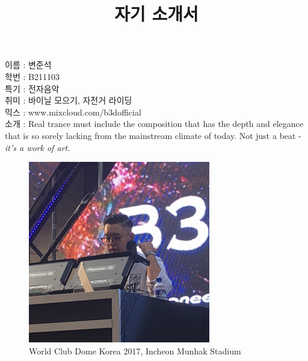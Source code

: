 \documentclass[a4paper,12pt]{article}
\begin{document}
 

\title{자기 소개서}

이름 : 변준석\\ 
학번 : B211103\\ 
특기 : 전자음악\\ 
취미 : 바이닐 모으기, 자전거 라이딩\\
믹스 : www.mixcloud.com/b3dofficial\\
소개 : Real trance must include the composition that has the depth and elegance that is so sorely lacking from the mainstream climate of today. Not just a beat - \textsl{it's a work of art.}

\begin{figure}[t]\vspace*{4pt} 
\centerline{\includegraphics[scale=1.0]{profile}} 
\caption{World Club Dome Korea 2017, Incheon Munhak Stadium}\vspace*{-6pt} 
\label{figure:rawdata} 
\end{figure} 
\end{document}
